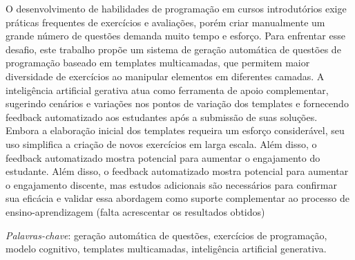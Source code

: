 \begin{resumo}
O desenvolvimento de habilidades de programação em cursos introdutórios exige práticas frequentes de exercícios e avaliações, porém criar manualmente um grande número de questões demanda muito tempo e esforço. Para enfrentar esse desafio, este trabalho propõe um sistema de geração automática de questões de programação baseado em templates multicamadas, que permitem maior diversidade de exercícios ao manipular elementos em diferentes camadas. A inteligência artificial gerativa atua como ferramenta de apoio complementar, sugerindo cenários e variações nos pontos de variação dos templates e fornecendo feedback automatizado aos estudantes após a submissão de suas soluções. Embora a elaboração inicial dos templates requeira um esforço considerável, seu uso simplifica a criação de novos exercícios em larga escala. Além disso, o feedback automatizado mostra potencial para aumentar o engajamento do estudante.  Além disso, o feedback automatizado mostra potencial para aumentar o engajamento discente, mas estudos adicionais são necessários para confirmar sua eficácia e validar essa abordagem como suporte complementar ao processo de ensino-aprendizagem  (falta acrescentar os resultados obtidos)
 
  \bigbreak

  \noindent
  \textit{Palavras-chave}: geração automática de questões, exercícios de programação, modelo cognitivo, templates multicamadas, inteligência artificial generativa.
\end{resumo}